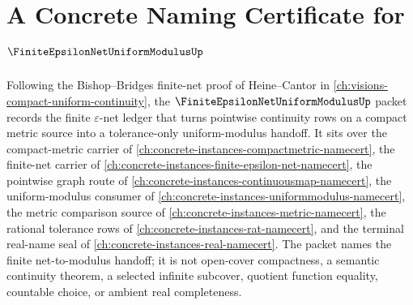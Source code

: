 \chapter{A Concrete Naming Certificate for $\FiniteEpsilonNetUniformModulusUp$}
\label{ch:concrete-instances-finite-epsilon-net-uniform-modulus-namecert}

Following the Bishop--Bridges finite-net proof of Heine--Cantor in \autoref{ch:visions-compact-uniform-continuity}, the $\FiniteEpsilonNetUniformModulusUp$ packet records the finite $\varepsilon$-net ledger that turns pointwise continuity rows on a compact metric source into a tolerance-only uniform-modulus handoff. It sits over the compact-metric carrier of \autoref{ch:concrete-instances-compactmetric-namecert}, the finite-net carrier of \autoref{ch:concrete-instances-finite-epsilon-net-namecert}, the pointwise graph route of \autoref{ch:concrete-instances-continuousmap-namecert}, the uniform-modulus consumer of \autoref{ch:concrete-instances-uniformmodulus-namecert}, the metric comparison source of \autoref{ch:concrete-instances-metric-namecert}, the rational tolerance rows of \autoref{ch:concrete-instances-rat-namecert}, and the terminal real-name seal of \autoref{ch:concrete-instances-real-namecert}. The packet names the finite net-to-modulus handoff; it is not open-cover compactness, a semantic continuity theorem, a selected infinite subcover, quotient function equality, countable choice, or ambient real completeness.

